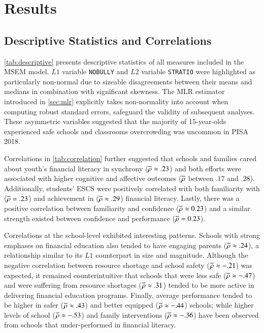 \section{Results}\label{chp:4}

\subsection{Descriptive Statistics and Correlations}

\cref{tab:descriptive} presents descriptive statistics of all measures included in the MSEM model. $L1$ variable \texttt{NOBULLY} and $L2$ variable \texttt{STRATIO} were highlighted as particularly non-normal due to sizeable disagreements between their means and medians in combination with significant skewness. The MLR estimator introduced in \cref{sec:mlr} explicitly takes non-normality into account when computing robust standard errors, safeguard the validity of subsequent analyses. These asymmetric variables suggested that the majority of 15-year-olds experienced safe schools and classrooms overcrowding was uncommon in PISA 2018.

Correlations in \cref{tab:correlation} further suggested that schools and families cared about youth's financial literacy in synchrony ($\overline{\rho} \approx .23$) and both efforts were associated with higher cognitive and affective outcomes ($\overline{\rho}$ between $.17$ and $.28$). Additionally, students' ESCS were positively correlated with both familiarity with ($\overline{\rho} = .23$) and achievement in ($\overline{\rho} \approx .29$) financial literacy. Lastly, there was a positive correlation between familiarity and confidence ($\overline{\rho} \approx 0.23$) and a similar strength existed between confidence and performance ($\overline{\rho} = 0.23$).

Correlations at the school-level exhibited interesting patterns. Schools with strong emphases on financial education also tended to have engaging parents ($\overline{\rho} \approx .24$), a relationship similar to its $L1$ counterpart in size and magnitude. Although the negative correlation between resource shortage and school safety ($\overline{\rho} \approx -.21$) was expected, it remained counterintuitive that schools that were less safe ($\overline{\rho} \approx -.47$) and were suffering from resource shortages ($\overline{\rho} \approx .31$) tended to be more active in delivering financial education programs. Finally, average performance tended to be higher in safer ($\overline{\rho} \approx .43$) and better equipped ($\overline{\rho} \approx -.44$) schools; while higher levels of school ($\overline{\rho} \approx -.53$) and family interventions ($\overline{\rho} \approx -.36$) have been observed from schools that under-performed in financial literacy.

